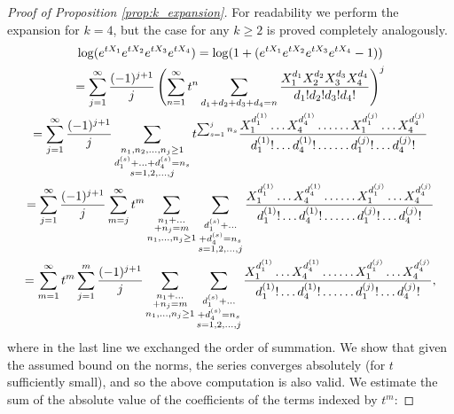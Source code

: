 \documentclass[11pt]{amsart}
\theoremstyle{plain}
\theoremstyle{remark}
\numberwithin{equation}{section}
\begin{document}
\begin{proof}[Proof of Proposition \ref{prop:k_expansion}]
For readability we perform the expansion for $k=4$, but the case for any $k\geq 2$ is proved completely analogously.
\begin{multline}
\log(e^{tX_1}e^{tX_2}e^{tX_3}e^{tX_4})
=\log(1+(e^{tX_1}e^{tX_2}e^{tX_3}e^{tX_4}-1))
%
\\=\sum_{j=1}^{\infty}\frac{(-1)^{j+1}}{j} \left(\sum_{n=1}^{\infty} t^n \sum_{d_1+d_2+d_3+d_4=n} \frac{X_1^{d_1} X_2^{d_2}X_3^{d_3} X_4^{d_4}}{d_1!d_2!d_3!d_4!} \right)^j
%
%
\\ =\sum_{j=1}^{\infty}\frac{(-1)^{j+1}}{j} 
\sum_{\substack{
n_1,n_2,\ldots, n_j\geq 1
\\d_1^{(s)}+\ldots+d_4^{(s)}=n_s
\\s=1,2,\ldots,j
}}
t^{\sum_{s=1}^{j}n_s} 
\frac
{X_1^{d_1^{(1)}}\ldots X_4^{d_4^{(1)}}\ldots\ldots X_1^{d_1^{(j)}}\ldots X_4^{d_4^{(j)}}}
{d_1^{(1)}! \ldots d_4^{(1)}!\ldots\ldots d_1^{(j)}! \ldots d_4^{(j)}!}
%
%
\\=\sum_{j=1}^{\infty}\frac{(-1)^{j+1}}{j} 
\sum_{m=j}^{\infty} t^m
%
\sum_{
\begin{subarray}{c}
 n_1+\ldots
 \\+n_j
=m
\\
n_1,\ldots, n_j\geq 1
\end{subarray}
}
\sum_{\substack{
\\d_1^{(s)}+\ldots
\\+d_4^{(s)}
=n_s
\\s=1,2,\ldots,j
}}
\frac
{X_1^{d_1^{(1)}}\ldots X_4^{d_4^{(1)}}\ldots\ldots X_1^{d_1^{(j)}}\ldots X_4^{d_4^{(j)}}}
{d_1^{(1)}! \ldots d_4^{(1)}!\ldots\ldots d_1^{(j)}! \ldots d_4^{(j)}!}
\\
%
%
=\sum_{m=1}^{\infty} t^m
\sum_{j=1}^{m}\frac{(-1)^{j+1}}{j} 
\sum_{
\substack{
n_1+
\ldots
\\+n_j=m
\\ 
n_1,\ldots, n_j\geq 1
}}
\sum_{\substack{
\\d_1^{(s)}+\ldots
\\+d_4^{(s)}
=n_s
\\s=1,2,\ldots,j
}}
%
\frac
{X_1^{d_1^{(1)}}\ldots X_4^{d_4^{(1)}}\ldots\ldots X_1^{d_1^{(j)}}\ldots X_4^{d_4^{(j)}}}
{d_1^{(1)}! \ldots d_4^{(1)}!\ldots\ldots d_1^{(j)}! \ldots d_4^{(j)}!},
\end{multline}
where in the last line we exchanged the order of summation. We show that given the assumed bound on the norms, the series converges absolutely (for $t$ sufficiently small), and so the above computation is also valid. We estimate the sum of the absolute value of the coefficients of the terms indexed by $t^m$:

\end{proof}
\end{document}
